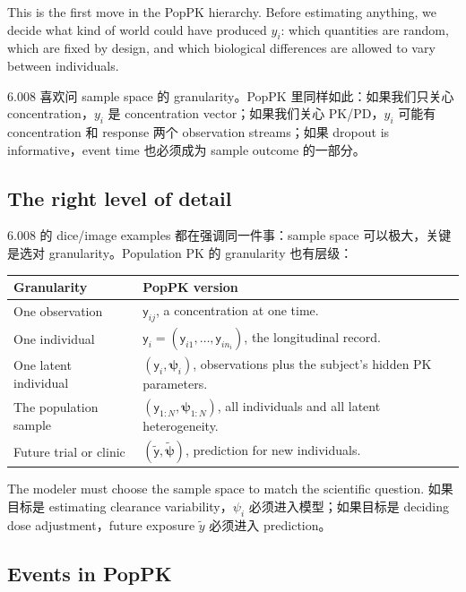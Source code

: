 \documentclass[a4paper]{article}
\newcommand{\rv}[1]{\mathsf{#1}}
\newcommand{\rpsi}{\boldsymbol{\psi}}
\begin{document}
This is the first move in the PopPK hierarchy.  Before estimating anything, we decide what kind of world could have produced \(y_i\): which quantities are random, which are fixed by design, and which biological differences are allowed to vary between individuals.

\begin{remark}
  6.008 喜欢问 sample space 的 granularity。PopPK 里同样如此：如果我们只关心 concentration，\(y_i\) 是 concentration vector；如果我们关心 PK/PD，\(y_i\) 可能有 concentration 和 response 两个 observation streams；如果 dropout is informative，event time 也必须成为 sample outcome 的一部分。
\end{remark}

\subsection{The right level of detail}

6.008 的 dice/image examples 都在强调同一件事：sample space 可以极大，关键是选对 granularity。Population PK 的 granularity 也有层级：

\begin{center}
\begin{tabularx}{0.96\textwidth}{p{}X}
\toprule
Granularity & PopPK version \\
\midrule
One observation & \(\rv{y}_{ij}\), a concentration at one time. \\
One individual & \(\rv{y}_i=(\rv{y}_{i1},\ldots,\rv{y}_{in_i})\), the longitudinal record. \\
One latent individual & \((\rv{y}_i,\rpsi_i)\), observations plus the subject's hidden PK parameters. \\
The population sample & \((\rv{y}_{1:N},\rpsi_{1:N})\), all individuals and all latent heterogeneity. \\
Future trial or clinic & \((\tilde{\rv{y}},\tilde{\rpsi})\), prediction for new individuals. \\
\bottomrule
\end{tabularx}
\end{center}

The modeler must choose the sample space to match the scientific question. 如果目标是 estimating clearance variability，\(\psi_i\) 必须进入模型；如果目标是 deciding dose adjustment，future exposure \(\tilde y\) 必须进入 prediction。

\subsection{Events in PopPK}
\end{document}
